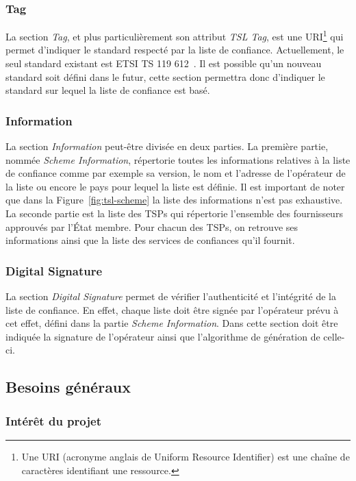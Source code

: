 \documentclass{tnreport}
\begin{document}
\subsubsection{Tag}

La section \textit{Tag}, et plus particulièrement son attribut \textit{TSL Tag}, est une URI\footnote{Une URI (acronyme anglais de Uniform Resource Identifier) est une chaîne de caractères identifiant une ressource.} qui permet d'indiquer le standard respecté par la liste de confiance. Actuellement, le seul standard  existant est ETSI TS 119 612~\cite{ETSITS119612}. Il est possible qu'un nouveau standard soit défini dans le futur, cette section permettra donc d'indiquer le standard sur lequel la liste de confiance est basé.

\subsubsection{Information}

La section \textit{Information} peut-être divisée en deux parties. 
La première partie, nommée \textit{Scheme Information}, répertorie toutes les informations relatives à la liste de confiance comme par exemple sa version, le nom et l'adresse de l'opérateur de la liste ou encore le pays pour lequel la liste est définie. Il est important de noter que dans la Figure~\ref{fig:tsl-scheme} la liste des informations n'est pas exhaustive. 
La seconde partie est la liste des TSPs qui répertorie l'ensemble des fournisseurs approuvés par l'État membre. Pour chacun des TSPs, on retrouve ses informations ainsi que la liste des services de confiances qu'il fournit.

\subsubsection{Digital Signature}

La section \textit{Digital Signature} permet de vérifier l'authenticité et l'intégrité de la liste de confiance. En effet, chaque liste doit être signée par l'opérateur prévu à cet effet, défini dans la partie \textit{Scheme Information}. Dans cette section doit être indiquée la signature de l'opérateur ainsi que l'algorithme de génération de celle-ci.

\subsection{Besoins généraux}

\subsubsection{Intérêt du projet}
\end{document}
